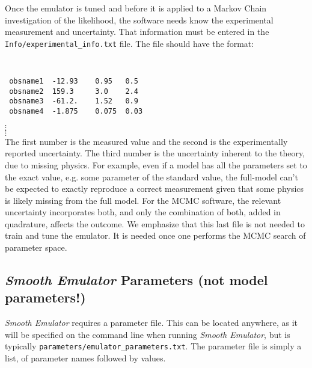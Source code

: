 \documentclass[UserManual.tex]{subfiles}
\begin{document}
\begin{enumerate}
Once the emulator is tuned and before it is applied to a Markov Chain investigation of the likelihood, the software needs know the experimental measurement and uncertainty. That information must be entered in the {\tt Info/experimental\_info.txt} file. The file should have the format:
{\tt
\begin{verbatim}
 obsname1  -12.93    0.95   0.5
 obsname2  159.3     3.0    2.4
 obsname3  -61.2.    1.52   0.9
 obsname4  -1.875    0.075  0.03
\end{verbatim}}
\vspace*{-16pt}
 \hspace*{28pt}$\vdots$\\
 \vspace*{-16pt}
 \hspace*{28pt}$\vdots$\\
The first number is the measured value and the second is the experimentally reported uncertainty. The third number is the uncertainty inherent to the theory, due to missing physics. For example, even if a model has all the parameters set to the exact value, e.g. some parameter of the standard value, the full-model can't be expected to exactly reproduce a correct measurement given that some physics is likely missing from the full model. For the MCMC software, the relevant uncertainty incorporates both, and only the combination of both, added in quadrature, affects the outcome. We emphasize that this last file is not needed to train and tune the emulator. It is needed once one performs the MCMC search of parameter space. 


\end{enumerate}




\subsection{{\it Smooth Emulator} Parameters (not model parameters!)}

{\it Smooth Emulator} requires a parameter file. This can be located anywhere, as it will be specified on the command line when running {\it Smooth Emulator}, but is typically {\tt parameters/emulator\_parameters.txt}. The parameter file is simply a list, of parameter names followed by values. 
\end{document}
